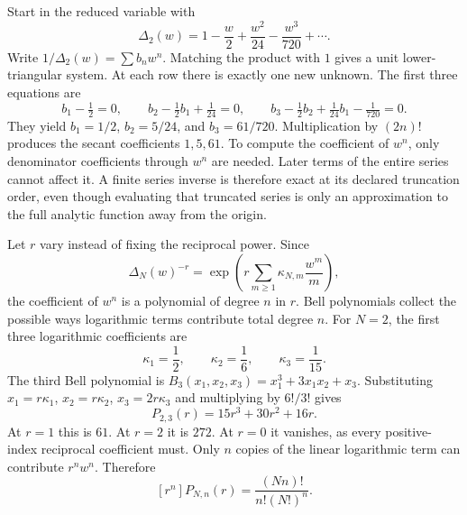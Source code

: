 Start in the reduced variable with
\[
\Delta_2(w)=1-\frac w2+\frac{w^2}{24}-\frac{w^3}{720}+\cdots.
\]
Write $1/\Delta_2(w)=\sum b_nw^n$. Matching the product with $1$ gives a unit lower-triangular system. At each row there is exactly one new unknown.
The first three equations are
\[
b_1-\tfrac12=0,\qquad b_2-\tfrac12b_1+\tfrac1{24}=0,
\qquad b_3-\tfrac12b_2+\tfrac1{24}b_1-\tfrac1{720}=0.
\]
They yield $b_1=1/2$, $b_2=5/24$, and $b_3=61/720$. Multiplication by $(2n)!$ produces the secant coefficients $1,5,61$.
To compute the coefficient of $w^n$, only denominator coefficients through $w^n$ are needed. Later terms of the entire series cannot affect it. A finite series inverse is therefore exact at its declared truncation order, even though evaluating that truncated series is only an approximation to the full analytic function away from the origin.

Let $r$ vary instead of fixing the reciprocal power. Since
\[
\Delta_N(w)^{-r}=\exp\!\left(r\sum_{m\ge1}\kappa_{N,m}\frac{w^m}{m}\right),
\]
the coefficient of $w^n$ is a polynomial of degree $n$ in $r$. Bell polynomials collect the possible ways logarithmic terms contribute total degree $n$.
For $N=2$, the first three logarithmic coefficients are
\[
\kappa_1=\frac12,\qquad\kappa_2=\frac16,\qquad\kappa_3=\frac1{15}.
\]
The third Bell polynomial is $B_3(x_1,x_2,x_3)=x_1^3+3x_1x_2+x_3$. Substituting $x_1=r\kappa_1$, $x_2=r\kappa_2$, $x_3=2r\kappa_3$ and multiplying by $6!/3!$ gives
\[
P_{2,3}(r)=15r^3+30r^2+16r.
\]
At $r=1$ this is $61$. At $r=2$ it is $272$. At $r=0$ it vanishes, as every positive-index reciprocal coefficient must.
Only $n$ copies of the linear logarithmic term can contribute $r^n w^n$. Therefore
\[
[r^n]P_{N,n}(r)=\frac{(Nn)!}{n!(N!)^n}.
\]


